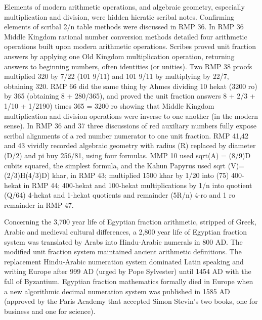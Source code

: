 \documentclass[12pt]{article}
\begin{document}
Elements of modern arithmetic operations, and algebraic geometry, especially multiplication and division, were hidden hieratic scribal notes. Confirming elements of scribal 2/n table methods were discussed in RMP 36. In RMP 36 Middle Kingdom rational number conversion methods detailed four arithmetic operations built upon modern arithmetic operations. Scribes proved unit fraction answers by applying one Old Kingdom multiplication operation, returning answers to beginning numbers, often identities (or unities). Two RMP 38 proofs multiplied 320 by 7/22 (101 9/11) and 101 9/11 by multiplying by 22/7, obtaining 320. RMP 66 did the same thing by Ahmes dividing 10 hekat (3200 ro) by 365 (obtaining 8 + 280/365), and proved the unit fraction answers 8 + 2/3 + 1/10 + 1/2190) times 365 = 3200 ro showing that Middle Kingdom multiplication and division operations were inverse to one another (in the modern sense). In RMP 36 and 37 three discussions of red auxiliary numbers fully expose scribal alignments of a red number numerator to one unit fraction. RMP 41,42 and 43 vividly recorded algebraic geometry with radius (R) replaced by diameter (D/2) and pi buy 256/81, using four formulas. MMP 10 used sqrt(A) = (8/9)D cubits squared, the simplest formula, and the Kahun Papyrus used sqrt (V)= (2/3)H(4/3)D) khar, in RMP 43; multiplied 1500 khar by 1/20 into (75) 400-hekat in RMP 44; 400-hekat and
100-hekat multiplications by 1/n into quotient (Q/64) 4-hekat and 1-hekat quotients and remainder (5R/n) 4-ro and 1 ro remainder in RMP 47.

Concerning the 3,700 year life of Egyptian fraction arithmetic, stripped of Greek, Arabic and medieval cultural differences, a 2,800 year life of Egyptian fraction system was translated by Arabs into Hindu-Arabic numerals in 800 AD. The modified unit fraction system maintained ancient arithmetic definitions. The replacement Hindu-Arabic numeration system dominated Latin speaking and writing Europe after 999 AD (urged by Pope Sylvester) until 1454 AD with the fall of Byzantium. Egyptian fraction mathematics formally died in Europe when a new algorithmic decimal numeration system was published in 1585 AD (approved by the Paris Academy that accepted Simon Stevin's two books, one for business and one for science).

\end{document}

